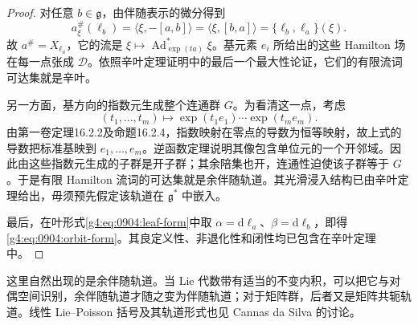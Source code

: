 \begin{proof}
	对任意 \(b\in\mathfrak g\)，由伴随表示的微分得到
	\[
		a_\xi^\#(\ell_b)
		=\langle\xi,-[a,b]\rangle
		=\langle\xi,[b,a]\rangle
		=\{\ell_b,\ell_a\}(\xi).
	\]
	故 \(a^\#=X_{\ell_a}\)，它的流是 \(\xi\mapsto\operatorname{Ad}_{\exp(ta)}^*\xi\)。基元素 \(e_i\) 所给出的这些 Hamilton 场在每一点张成 \(\mathcal D\)。依照辛叶定理证明中的最后一个最大性论证，它们的有限流词可达集就是辛叶。

	另一方面，基方向的指数元生成整个连通群 \(G\)。为看清这一点，考虑
	\[
		(t_1,\ldots,t_m)\longmapsto
		\exp(t_1e_1)\cdots\exp(t_me_m).
	\]
	由第一卷定理16.2.2及命题16.2.4，指数映射在零点的导数为恒等映射，故上式的导数把标准基映到 \(e_1,\ldots,e_m\)。逆函数定理说明其像包含单位元的一个开邻域。因此由这些指数元生成的子群是开子群；其余陪集也开，连通性迫使该子群等于 \(G\)。于是有限 Hamilton 流词的可达集就是余伴随轨道。其光滑浸入结构已由辛叶定理给出，毋须预先假定该轨道在 \(\mathfrak g^*\) 中嵌入。

	最后，在叶形式\eqref{g4:eq:0904:leaf-form}中取 \(\alpha=\mathrm{d}\ell_a\)、\(\beta=\mathrm{d}\ell_b\)，即得\eqref{g4:eq:0904:orbit-form}。其良定义性、非退化性和闭性均已包含在辛叶定理中。
\end{proof}

这里自然出现的是余伴随轨道。当 Lie 代数带有适当的不变内积，可以把它与对偶空间识别，余伴随轨道才随之变为伴随轨道；对于矩阵群，后者又是矩阵共轭轨道。线性 Lie--Poisson 括号及其轨道形式也见 Cannas da Silva 的讨论。\cite[第5.1节，第141--142页]{Cannas2006Symplectic}

